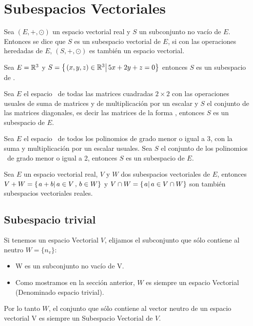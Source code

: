 \newpage
\section{Subespacios Vectoriales}
\begin{dfn}
Sea $(E, +, \odot)$ un espacio vectorial real y $S$ un subconjunto no vacío de $E$. Entonces se dice que $S$ es un subespacio vectorial de $E$, si con las operaciones heredadas de $E$, $(S, +, \odot)$ es también un espacio vectorial.
\end{dfn}


\begin{ejemplo}
Sea $E = \mathbb{R}^3$ y $S = \left\{ \left. (x, y, z) \in \mathbb{R}^3\right| 5x + 2y + z = 0 \right\}$ entonces $S$ es un subespacio de \rtres.
\end{ejemplo}

\begin{ejemplo}
Sea $E$ el espacio \mdosxdos \ de todas las matrices cuadradas $2 \times 2$ con las operaciones usuales de suma de matrices y de multiplicación por un escalar y $S$ el conjunto de las matrices diagonales, es decir las matrices de la forma , entonces $S$ es un subespacio de $E$.

\end{ejemplo}

\begin{ejemplo}
Sea $E$ el espacio \ptres \ de todos los polinomios de grado menor o igual a 3, con la suma y multiplicación por un escalar usuales. Sea $S$ el conjunto de los polinomios \pdos \ de grado menor o igual a 2, entonces $S$ es un subespacio de $E$.
\end{ejemplo}

\begin{ejemplo}

Sea $E$ un espacio vectorial real, $V$ y $W$ dos subespacios vectoriales de $E$, entonces $V + W =\left\{ \left. a+b\right| a \in V \, , \, b \in W \right\}$ y $V \cap W = \left\{ \left. a\right| a \in V \cap W \right\}$ son también subespacios vectoriales reales.
\end{ejemplo}



\subsection{Subespacio trivial}
Si tenemos un espacio Vectorial $V$, elijamos el subconjunto que s\'olo contiene al neutro
$W=\lbrace n_v\rbrace$:
~\\	
\begin{itemize}
 \item W es un subconjunto no vac\'io de V.
\item Como mostramos en la sección anterior, $W$ es siempre un espacio Vectorial (Denominado espacio trivial).
 \end{itemize} 
Por lo tanto $W$, el conjunto que s\'olo contiene al vector neutro de un espacio vectorial V es siempre un Subespacio Vectorial de $V$.
